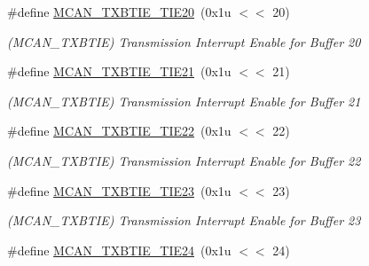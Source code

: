 \begin{DoxyCompactItemize}
\mbox{\label{group__SAMV71__MCAN_gad9ff414ebc993b3b2598aa98bcc6a2a1}} 
\#define \mbox{\hyperlink{group__SAMV71__MCAN_gad9ff414ebc993b3b2598aa98bcc6a2a1}{M\+C\+A\+N\+\_\+\+T\+X\+B\+T\+I\+E\+\_\+\+T\+I\+E20}}~(0x1u $<$$<$ 20)
\begin{DoxyCompactList}\small\item\em (M\+C\+A\+N\+\_\+\+T\+X\+B\+T\+IE) Transmission Interrupt Enable for Buffer 20 \end{DoxyCompactList}\item 
\mbox{\label{group__SAMV71__MCAN_ga661c6ee4d411ee9b9c5215170f3a2bec}} 
\#define \mbox{\hyperlink{group__SAMV71__MCAN_ga661c6ee4d411ee9b9c5215170f3a2bec}{M\+C\+A\+N\+\_\+\+T\+X\+B\+T\+I\+E\+\_\+\+T\+I\+E21}}~(0x1u $<$$<$ 21)
\begin{DoxyCompactList}\small\item\em (M\+C\+A\+N\+\_\+\+T\+X\+B\+T\+IE) Transmission Interrupt Enable for Buffer 21 \end{DoxyCompactList}\item 
\mbox{\label{group__SAMV71__MCAN_ga489a5c9a86509692f79a417cdb52a4a5}} 
\#define \mbox{\hyperlink{group__SAMV71__MCAN_ga489a5c9a86509692f79a417cdb52a4a5}{M\+C\+A\+N\+\_\+\+T\+X\+B\+T\+I\+E\+\_\+\+T\+I\+E22}}~(0x1u $<$$<$ 22)
\begin{DoxyCompactList}\small\item\em (M\+C\+A\+N\+\_\+\+T\+X\+B\+T\+IE) Transmission Interrupt Enable for Buffer 22 \end{DoxyCompactList}\item 
\mbox{\label{group__SAMV71__MCAN_ga81e96f8dbcee1c2738783bae7a7c834c}} 
\#define \mbox{\hyperlink{group__SAMV71__MCAN_ga81e96f8dbcee1c2738783bae7a7c834c}{M\+C\+A\+N\+\_\+\+T\+X\+B\+T\+I\+E\+\_\+\+T\+I\+E23}}~(0x1u $<$$<$ 23)
\begin{DoxyCompactList}\small\item\em (M\+C\+A\+N\+\_\+\+T\+X\+B\+T\+IE) Transmission Interrupt Enable for Buffer 23 \end{DoxyCompactList}\item 
\mbox{\label{group__SAMV71__MCAN_ga8b1eb7aaf2c8bc3b73c5c718d5ea3427}} 
\#define \mbox{\hyperlink{group__SAMV71__MCAN_ga8b1eb7aaf2c8bc3b73c5c718d5ea3427}{M\+C\+A\+N\+\_\+\+T\+X\+B\+T\+I\+E\+\_\+\+T\+I\+E24}}~(0x1u $<$$<$ 24)
$$
\end{DoxyCompactItemize}
